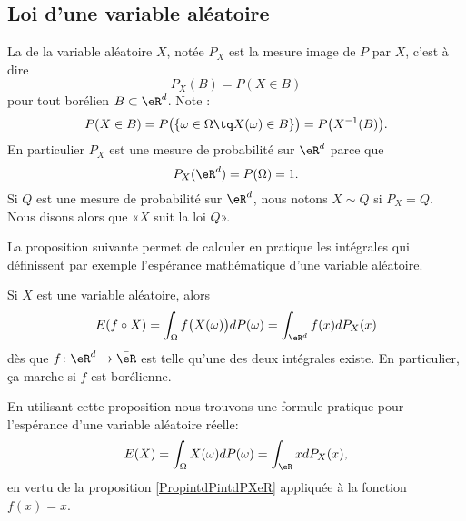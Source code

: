 \subsection{Loi d'une variable aléatoire}

La  de la variable aléatoire \( X\), notée \( P_X\) est la mesure image de \( P\) par \( X\), c'est à dire
\begin{equation}
    P_X(B)=P(X\in B)
\end{equation}
pour tout borélien \( B\subset\eR^d\). Note :
\begin{equation}
    P(X\in B)=P\big( \{ \omega\in\Omega\tq X(\omega)\in B \} \big)=P\big( X^{-1}(B) \big).
\end{equation}
En particulier \( P_X\) est une mesure de probabilité sur \( \eR^d\) parce que 
\begin{equation}
    P_X(\eR^d)=P(\Omega)=1.
\end{equation}
Si \( Q\) est une mesure de probabilité sur \( \eR^d\), nous notons \( X\sim Q\) si \( P_X=Q\). Nous disons alors que «\( X\) suit la loi \( Q\)».

La proposition suivante permet de calculer en pratique les intégrales qui définissent par exemple l'espérance mathématique d'une variable aléatoire.
\begin{proposition}\label{PropintdPintdPXeR}
    Si \( X\) est une variable aléatoire, alors
    \begin{equation}
        E(f\circ X)=\int_{\Omega}f\big( X(\omega) \big)dP(\omega)=\int_{\eR^d}f(x)dP_X(x)
    \end{equation}
    dès que \( f\colon \eR^d\to \bar\eR\) est telle qu'une des deux intégrales existe. En particulier, ça marche si \( f\) est borélienne.
\end{proposition}


En utilisant cette proposition nous trouvons une formule pratique pour l'espérance d'une variable aléatoire réelle:
\begin{equation}
    E(X)=\int_{\Omega}X(\omega)dP(\omega)=\int_{\eR}xdP_X(x),
\end{equation}
en vertu de la proposition \ref{PropintdPintdPXeR} appliquée à la fonction \( f(x)=x\).

